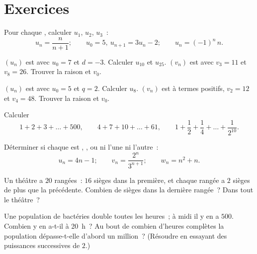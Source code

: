 \section{Exercices}

\begin{exercise}[$\star$]\label{exo:g11:seq:1}
Pour chaque , calculer $u_1$, $u_2$, $u_3$~:
\[
u_n = \frac{n}{n+1}; \qquad
u_0 = 5,\ u_{n+1} = 3u_n - 2; \qquad
u_n = (-1)^n\,n .
\]
\end{exercise}

\begin{exercise}[$\star$]\label{exo:g11:seq:2}
$(u_n)$ est  avec $u_0 = 7$ et $d = -3$. Calculer $u_{10}$
et $u_{25}$. $(v_n)$ est  avec $v_3 = 11$ et $v_8 = 26$.
Trouver la raison et $v_0$.
\end{exercise}

\begin{exercise}[$\star$]\label{exo:g11:seq:3}
$(u_n)$ est  avec $u_0 = 5$ et $q = 2$. Calculer $u_8$.
$(v_n)$ est  à termes positifs, $v_2 = 12$ et $v_4 = 48$.
Trouver la raison et $v_0$.
\end{exercise}

\begin{exercise}[$\star$]\label{exo:g11:seq:4}
Calculer
\[
1 + 2 + 3 + \dots + 500, \qquad
4 + 7 + 10 + \dots + 61, \qquad
1 + \frac12 + \frac14 + \dots + \frac{1}{2^{10}} .
\]
\end{exercise}

\begin{exercise}[$\star$]\label{exo:g11:seq:5}
Déterminer si chaque  est , , ou ni l'une
ni l'autre~:
\[
u_n = 4n - 1; \qquad
v_n = \frac{2^n}{3^{n+1}}; \qquad
w_n = n^2 + n .
\]
\end{exercise}

\begin{exercise}[$\star\star$]\label{exo:g11:seq:6}
Un théâtre a $20$ rangées~: $16$ sièges dans la première, et chaque
rangée a $2$ sièges de plus que la précédente. Combien de sièges dans
la dernière rangée~? Dans tout le théâtre~?
\end{exercise}

\begin{exercise}[$\star\star$]\label{exo:g11:seq:7}
Une population de bactéries double toutes les heures~; à midi il y en a
$500$. Combien y en a-t-il à 20~h~? Au bout de combien d'heures
complètes la population dépasse-t-elle d'abord un million~? (Résoudre
en essayant des puissances successives de $2$.)
\end{exercise}

